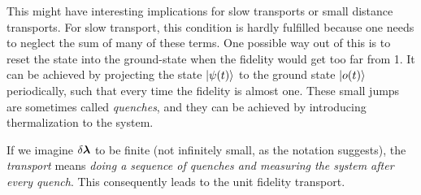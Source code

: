 This might have interesting implications for slow transports or small distance transports. For slow transport, this condition is hardly fulfilled because one needs to neglect the sum of many of these terms. One possible way out of this is to reset the state into the ground-state when the fidelity would get too far from 1. It can be achieved by projecting the state $\ket{\psi(t)}$ to the ground state $\ket{o(t)}$ periodically, such that every time the fidelity is almost one. These small jumps are sometimes called \emph{quenches}, and they can be achieved by introducing thermalization to the system.






If we imagine $\delta{\bm\lambda}$ to be finite (not infinitely small, as the notation suggests), the \emph{transport} means \emph{doing a sequence of quenches and measuring the system after every quench}. This consequently leads to the unit fidelity transport.













